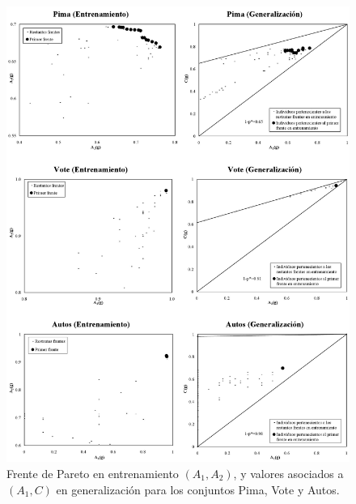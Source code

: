 \begin{figure}[!htb]
\centering
	\includegraphics[keepaspectratio,width=13cm]{figuras/tanda3.jpg}
\caption{Frente de Pareto en entrenamiento $(A_{1},A_{2})$, y valores asociados a
$(A_{1},C)$ en generalización para los conjuntos Pima, Vote y Autos.}
\label{tanda3}
\end{figure}

